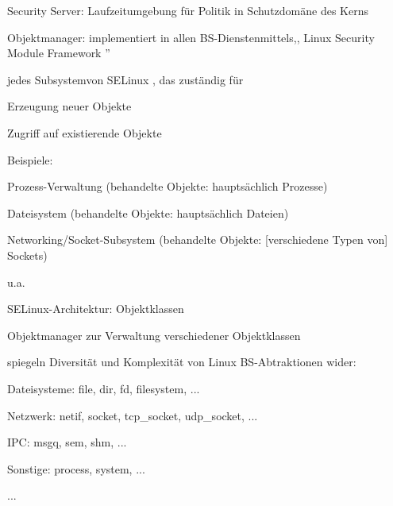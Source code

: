 \documentclass[a4paper]{article}
\begin{document}
\begin{multicols}{3}
    \begin{itemize*}
        \item
        Security Server: Laufzeitumgebung für Politik in Schutzdomäne des
        Kerns
        \item
        Objektmanager: implementiert in allen BS-Dienstenmittels,, Linux
        Security Module Framework ''
        \begin{itemize*}
            \item jedes Subsystemvon SELinux , das zuständig für \begin{enumerate*} \item Erzeugung neuer Objekte \item Zugriff auf existierende Objekte \end{enumerate*}
            \item Beispiele: \begin{enumerate*} \item Prozess-Verwaltung (behandelte Objekte: hauptsächlich Prozesse) \item Dateisystem (behandelte Objekte: hauptsächlich Dateien) \item Networking/Socket-Subsystem (behandelte Objekte: {[}verschiedene Typen von{]} Sockets) \item u.a. \end{enumerate*}
        \end{itemize*}
    \end{itemize*}

    SELinux-Architektur: Objektklassen

    \begin{itemize*}
        \item
        Objektmanager zur Verwaltung verschiedener Objektklassen
        \item
        spiegeln Diversität und Komplexität von Linux BS-Abtraktionen wider:
        \begin{itemize*}
            \item Dateisysteme: file, dir, fd, filesystem, ...
            \item Netzwerk: netif, socket, tcp\_socket, udp\_socket, ...
            \item IPC: msgq, sem, shm, ...
            \item Sonstige: process, system, ...
            \item ...
        \end{itemize*}
    \end{itemize*}


\end{multicols}
\end{document}
